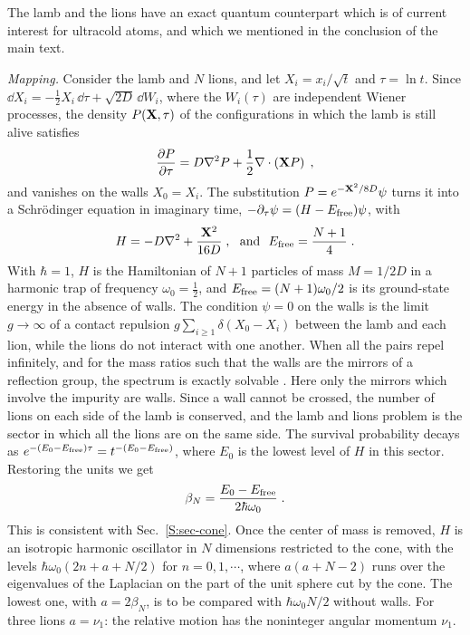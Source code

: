 The lamb and the lions have an exact quantum counterpart which is of current interest for ultracold atoms, and which we mentioned in the conclusion of the main text.

\emph{Mapping.} Consider the lamb and $N$ lions, and let $X_i = x_i/\sqrt{t}$ and $\tau = \ln t$. Since $\dd X_i = - \frac{1}{2} X_i \, \dd \tau + \sqrt{2D} \, \dd W_i$, where the $W_i(\tau)$ are independent Wiener processes, the density $P(\vb{X}, \tau)$ of the configurations in which the lamb is still alive satisfies
\begin{equation} \label{S:OU}
    \pdv{P}{\tau} = D \laplacian P + \frac{1}{2} \nabla \cdot \left( \vb{X} P \right) \;,
\end{equation}
and vanishes on the walls $X_0 = X_i$. The substitution $P = e^{-\vb{X}^2/8D} \psi$ turns it into a Schr\"odinger equation in imaginary time, $- \partial_\tau \psi = (H - E_{\rm free}) \psi$, with
\begin{equation} \label{S:trap-H}
    H = - D \laplacian + \frac{\vb{X}^2}{16 D} \;, \mbox{~~and~~} E_{\rm free} = \frac{N + 1}{4} \;.
\end{equation}
With $\hbar = 1$, $H$ is the Hamiltonian of $N + 1$ particles of mass $M = 1/2D$ in a harmonic trap of frequency $\omega_0 = \frac{1}{2}$, and $E_{\rm free} = (N+1) \omega_0/2$ is its ground-state energy in the absence of walls. The condition $\psi = 0$ on the walls is the limit $g \to \infty$ of a contact repulsion $g \sum_{i \geq 1} \delta(X_0 - X_i)$ between the lamb and each lion, while the lions do not interact with one another. When all the pairs repel infinitely, and for the mass ratios such that the walls are the mirrors of a reflection group, the spectrum is exactly solvable \cite{HODVJZ17}. Here only the mirrors which involve the impurity are walls. Since a wall cannot be crossed, the number of lions on each side of the lamb is conserved, and the lamb and lions problem is the sector in which all the lions are on the same side. The survival probability decays as $e^{-(E_0 - E_{\rm free}) \tau} = t^{-(E_0 - E_{\rm free})}$, where $E_0$ is the lowest level of $H$ in this sector. Restoring the units we get
\begin{equation} \label{S:beta-E}
    \beta_N = \frac{E_0 - E_{\rm free}}{2 \hbar \omega_0} \;.
\end{equation}
This is consistent with Sec.~\ref{S:sec-cone}. Once the center of mass is removed, $H$ is an isotropic harmonic oscillator in $N$ dimensions restricted to the cone, with the levels $\hbar \omega_0 (2n + a + N/2)$ for $n = 0, 1, \cdots$, where $a (a + N - 2)$ runs over the eigenvalues of the Laplacian on the part of the unit sphere cut by the cone. The lowest one, with $a = 2 \beta_N$, is to be compared with $\hbar \omega_0 N/2$ without walls. For three lions $a = \nu_1$: the relative motion has the noninteger angular momentum $\nu_1$.

